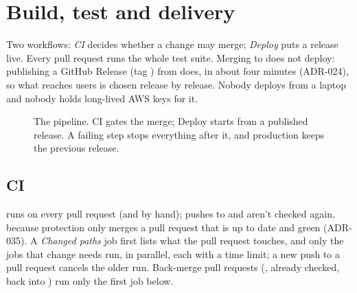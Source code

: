 \chapter{Build, test and delivery}\label{ch:delivery}

Two workflows: \emph{CI} decides whether a change may merge; \emph{Deploy} puts a release live.
Every pull request runs the whole test suite. Merging to  does not deploy: publishing
a GitHub Release (tag ) from  does, in about four minutes (ADR-024), so
what reaches users is chosen release by release. Nobody deploys from a laptop and nobody holds
long-lived AWS keys for it.

\begin{figure}[htbp]
  \centering
  
  \caption{The pipeline. CI gates the merge; Deploy starts from a published release. A failing
    step stops everything after it, and production keeps the previous release.}
  \label{fig:pipeline}
\end{figure}

\section{CI}\label{sec:ci}
 runs on every pull request (and by hand); pushes to  and
 aren't checked again, because protection only merges a pull request that is up to
date and green (ADR-035). A \emph{Changed paths} job first lists what the pull request touches, and
only the jobs that change needs run, in parallel, each with a time limit; a new push to a pull
request cancels the older run. Back-merge pull requests (, already checked, back into
) run only the first job below.

